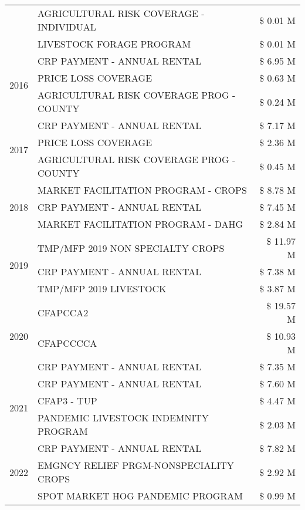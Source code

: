 \begin{tabular}{llr}
 & AGRICULTURAL RISK COVERAGE - INDIVIDUAL & \$ 0.01 M \\
 & LIVESTOCK FORAGE PROGRAM & \$ 0.01 M \\
\cline{1-3}
\multirow[t]{3}{*}{2016} & CRP PAYMENT - ANNUAL RENTAL & \$ 6.95 M \\
 & PRICE LOSS COVERAGE & \$ 0.63 M \\
 & AGRICULTURAL RISK COVERAGE PROG - COUNTY & \$ 0.24 M \\
\cline{1-3}
\multirow[t]{3}{*}{2017} & CRP PAYMENT - ANNUAL RENTAL & \$ 7.17 M \\
 & PRICE LOSS COVERAGE & \$ 2.36 M \\
 & AGRICULTURAL RISK COVERAGE PROG - COUNTY & \$ 0.45 M \\
\cline{1-3}
\multirow[t]{3}{*}{2018} & MARKET FACILITATION PROGRAM - CROPS & \$ 8.78 M \\
 & CRP PAYMENT - ANNUAL RENTAL & \$ 7.45 M \\
 & MARKET FACILITATION PROGRAM - DAHG & \$ 2.84 M \\
\cline{1-3}
\multirow[t]{3}{*}{2019} & TMP/MFP 2019 NON SPECIALTY CROPS & \$ 11.97 M \\
 & CRP PAYMENT - ANNUAL RENTAL & \$ 7.38 M \\
 & TMP/MFP 2019 LIVESTOCK & \$ 3.87 M \\
\cline{1-3}
\multirow[t]{3}{*}{2020} & CFAPCCA2 & \$ 19.57 M \\
 & CFAPCCCCA & \$ 10.93 M \\
 & CRP PAYMENT - ANNUAL RENTAL & \$ 7.35 M \\
\cline{1-3}
\multirow[t]{3}{*}{2021} & CRP PAYMENT - ANNUAL RENTAL & \$ 7.60 M \\
 & CFAP3 - TUP & \$ 4.47 M \\
 & PANDEMIC LIVESTOCK INDEMNITY PROGRAM & \$ 2.03 M \\
\cline{1-3}
\multirow[t]{3}{*}{2022} & CRP PAYMENT - ANNUAL RENTAL & \$ 7.82 M \\
 & EMGNCY RELIEF PRGM-NONSPECIALITY CROPS & \$ 2.92 M \\
 & SPOT MARKET HOG PANDEMIC PROGRAM & \$ 0.99 M \\
\cline{1-3}
\bottomrule
\end{tabular}
